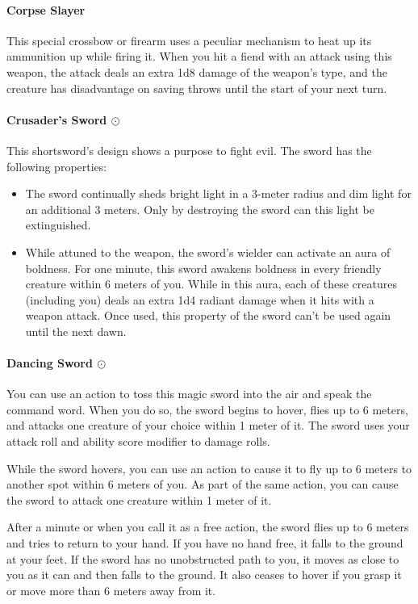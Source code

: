     \paragraph{Corpse Slayer}
        This special crossbow or firearm uses a peculiar mechanism to heat up its ammunition up while firing it.
        When you hit a fiend with an attack using this weapon, the attack deals an extra 1d8 damage of the weapon's type, and the creature has disadvantage on saving throws until the start of your next turn.
    \paragraph{Crusader's Sword $\odot$}
        This shortsword's design shows a purpose to fight evil.
        The sword has the following properties:
        \begin{itemize}
            \item The sword continually sheds bright light in a 3-meter radius and dim light for an additional 3 meters.
            Only by destroying the sword can this light be extinguished.
            \item While attuned to the weapon, the sword's wielder can activate an aura of boldness.
            For one minute, this sword awakens boldness in every friendly creature within 6 meters of you.
            While in this aura, each of these creatures (including you) deals an extra 1d4 radiant damage when it hits with a weapon attack.
            Once used, this property of the sword can't be used again until the next dawn.
        \end{itemize}
    \paragraph{Dancing Sword $\odot$}
        You can use an action to toss this magic sword into the air and speak the command word.
        When you do so, the sword begins to hover, flies up to 6 meters, and attacks one creature of your choice within 1 meter of it.
        The sword uses your attack roll and ability score modifier to damage rolls.

        While the sword hovers, you can use an action to cause it to fly up to 6 meters to another spot within 6 meters of you.
        As part of the same action, you can cause the sword to attack one creature within 1 meter of it.

        After a minute or when you call it as a free action, the sword flies up to 6 meters and tries to return to your hand.
        If you have no hand free, it falls to the ground at your feet.
        If the sword has no unobstructed path to you, it moves as close to you as it can and then falls to the ground.
        It also ceases to hover if you grasp it or move more than 6 meters away from it.

